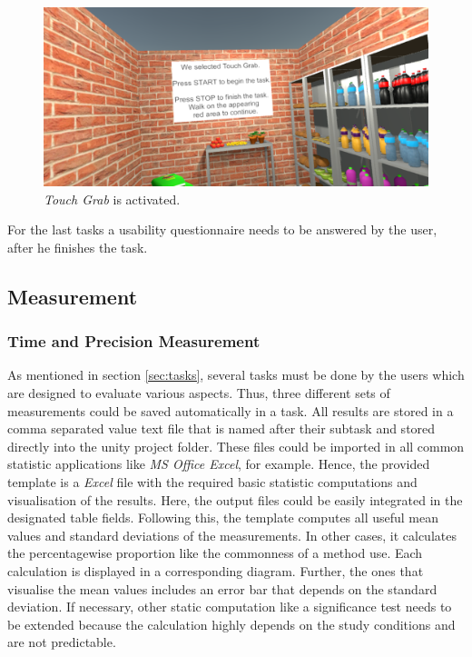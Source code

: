 \begin{figure}[H] 
	\center 
	\includegraphics[width=12cm]{Images/TaskWall_2.PNG}
	\caption[\textit{Touch Grab} is activated.]{\textit{Touch Grab} is activated.}
	\label{fig:taskW2}
\end{figure}

For the last tasks a usability questionnaire needs to be answered by the user, after he finishes the task. 


\subsection{Measurement} \label{sec:measurement}

\subsubsection{Time and Precision Measurement}
As mentioned in section \ref{sec:tasks}, several tasks must be done by the users which are designed to evaluate various aspects. Thus, three different sets of measurements could be saved automatically in a task. All results are stored in a comma separated value text file that is named after their subtask and stored directly into the unity project folder. These files could be imported in all common statistic applications like \textit{MS Office Excel}, for example. Hence, the provided template is a \textit{Excel} file with the required basic statistic computations and visualisation of the results. Here, the output files could be easily integrated in the designated table fields. Following this, the template computes all useful mean values and standard deviations of the measurements. In other cases, it calculates the percentagewise proportion like the commonness of a method use. Each calculation is displayed in a corresponding diagram. Further, the ones that visualise the mean values includes an error bar that depends on the standard deviation. If necessary, other static computation like a significance test needs to be extended because the calculation highly depends on the study conditions and are not predictable.

